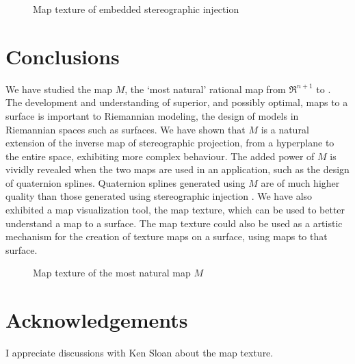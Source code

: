 \begin{figure}
\vspace{5in}
\caption{Map texture of embedded stereographic injection}
\label{fig:texturestereo}
\end{figure}

\section{Conclusions}
\label{sec:conclusions}

We have studied the map $M$, 
the `most natural' rational map from $\Re^{n+1}$ to .
The development and understanding of superior, and possibly optimal,
maps to a surface is important to Riemannian modeling, 
the design of models in Riemannian spaces such as surfaces.
We have shown that $M$ is a natural extension of the inverse map of
stereographic projection, from a hyperplane to the entire space,
exhibiting more complex behaviour.
The added power of $M$ is vividly revealed when the two maps are used
in an application, such as the design of quaternion splines.
Quaternion splines generated using $M$ are of much higher quality
than those generated using stereographic injection \cite{jj+jimbo99}.
We have also exhibited a map visualization tool, the map texture,
which can be used to better understand a map to a surface.
The map texture could also be used as a artistic mechanism for the 
creation of texture maps on a surface, using maps to that surface.

\begin{figure}
\vspace{5in}
\caption{Map texture of the most natural map $M$}
\label{fig:textureperfect}
\end{figure}

\section{Acknowledgements}

I appreciate discussions with Ken Sloan about the map texture.

